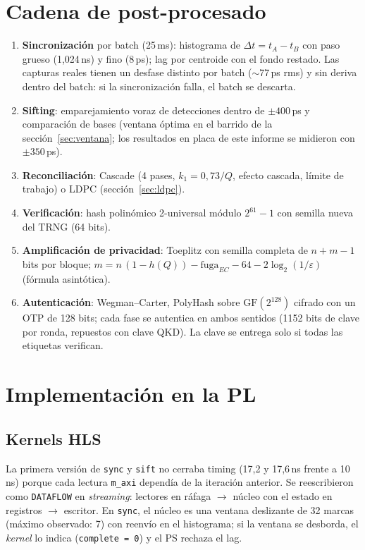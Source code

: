 \documentclass[a4paper,11pt]{article}
\newcommand{\code}[1]{\texttt{#1}}
\begin{document}
\section{Cadena de post-procesado}

\begin{enumerate}
  \item \textbf{Sincronización} por batch (25\,ms): histograma de $\Delta t = t_A - t_B$ con paso grueso
        (1,024\,ns) y fino (8\,ps); lag por centroide con el fondo restado. Las capturas reales tienen un
        desfase distinto por batch ($\sim$77\,ps rms) y sin deriva dentro del batch: si la sincronización
        falla, el batch se descarta.
  \item \textbf{Sifting}: emparejamiento voraz de detecciones dentro de $\pm400$\,ps y comparación de bases (ventana óptima en el barrido de la sección~\ref{sec:ventana}; los resultados en placa de este informe se midieron con $\pm350$\,ps).
  \item \textbf{Reconciliación}: Cascade (4 pases, $k_1 = 0{,}73/Q$, efecto cascada, límite de trabajo) o
        LDPC (sección~\ref{sec:ldpc}).
  \item \textbf{Verificación}: hash polinómico 2-universal módulo $2^{61}-1$ con semilla nueva del TRNG (64 bits).
  \item \textbf{Amplificación de privacidad}: Toeplitz con semilla completa de $n+m-1$ bits por bloque;
        $m = n\,(1-h(Q)) - \text{fuga}_{EC} - 64 - 2\log_2(1/\varepsilon)$ (fórmula asintótica).
  \item \textbf{Autenticación}: Wegman--Carter, PolyHash sobre $\mathrm{GF}(2^{128})$ cifrado con un OTP de
        128 bits; cada fase se autentica en ambos sentidos (1152 bits de clave por ronda, repuestos con clave QKD).
        La clave se entrega solo si todas las etiquetas verifican.
\end{enumerate}

\section{Implementación en la PL}

\subsection{Kernels HLS}
La primera versión de \code{sync} y \code{sift} no cerraba timing (17,2 y 17,6\,ns frente a 10\,ns) porque cada
lectura \code{m\_axi} dependía de la iteración anterior. Se reescribieron como \code{DATAFLOW} en
\emph{streaming}: lectores en ráfaga $\rightarrow$ núcleo con el estado en registros $\rightarrow$ escritor.
En \code{sync}, el núcleo es una ventana deslizante de 32 marcas (máximo observado: 7) con reenvío en el
histograma; si la ventana se desborda, el \emph{kernel} lo indica (\code{complete = 0}) y el PS rechaza el lag.
\end{document}

